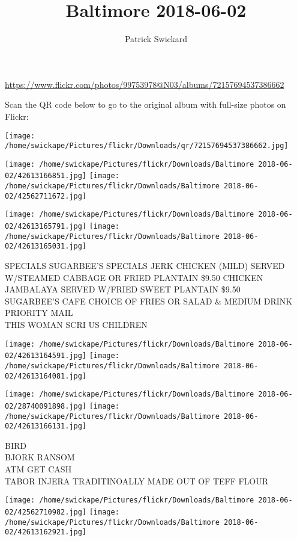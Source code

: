 \documentclass[10pt,letterpaper]{article}
\title{Baltimore 2018-06-02}
\author{Patrick Swickard}
\date{}
\begin{document}
\maketitle

\url{https://www.flickr.com/photos/99753978@N03/albums/72157694537386662}

Scan the QR code below to go to the original album with full-size photos on Flickr:

\texttt{[image: /home/swickape/Pictures/flickr/Downloads/qr/72157694537386662.jpg]}
\pagebreak

\texttt{[image: /home/swickape/Pictures/flickr/Downloads/Baltimore 2018-06-02/42613166851.jpg]}
\texttt{[image: /home/swickape/Pictures/flickr/Downloads/Baltimore 2018-06-02/42562711672.jpg]}

\texttt{[image: /home/swickape/Pictures/flickr/Downloads/Baltimore 2018-06-02/42613165791.jpg]}
\texttt{[image: /home/swickape/Pictures/flickr/Downloads/Baltimore 2018-06-02/42613165031.jpg]}

SPECIALS SUGARBEE'S SPECIALS JERK CHICKEN (MILD) SERVED W/STEAMED CABBAGE OR FRIED PLANTAIN \$9.50 CHICKEN JAMBALAYA SERVED W/FRIED SWEET PLANTAIN \$9.50\\
SUGARBEE'S CAFE CHOICE OF FRIES OR SALAD \& MEDIUM DRINK\\
PRIORITY MAIL\\
THIS WOMAN SCRI US CHILDREN
\pagebreak

\texttt{[image: /home/swickape/Pictures/flickr/Downloads/Baltimore 2018-06-02/42613164591.jpg]}
\texttt{[image: /home/swickape/Pictures/flickr/Downloads/Baltimore 2018-06-02/42613164081.jpg]}

\texttt{[image: /home/swickape/Pictures/flickr/Downloads/Baltimore 2018-06-02/28740091898.jpg]}
\texttt{[image: /home/swickape/Pictures/flickr/Downloads/Baltimore 2018-06-02/42613166131.jpg]}

BIRD\\
BJORK RANSOM\\
ATM GET CASH\\
TABOR INJERA TRADITINOALLY MADE OUT OF TEFF FLOUR
\pagebreak

\texttt{[image: /home/swickape/Pictures/flickr/Downloads/Baltimore 2018-06-02/42562710982.jpg]}
\texttt{[image: /home/swickape/Pictures/flickr/Downloads/Baltimore 2018-06-02/42613162921.jpg]}
\end{document}
